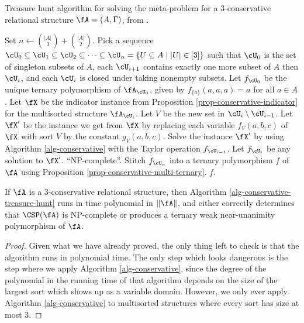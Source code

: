 \begin{algorithm}
\caption{Treasure hunt algorithm for solving the meta-problem for a $3$-conservative relational structure $\fA = (A, \Gamma)$, from \cite{carbonnel-thesis}.}\label{alg-conservative-treasure-hunt}
\begin{algorithmic}[1]
\State Set $n \gets \binom{|A|}{3} + \binom{|A|}{2}$.
\State Pick a sequence $\cU_0 \subseteq \cU_1 \subseteq \cU_2 \subseteq \cdots \subseteq \cU_{n} = \{U \subseteq A \mid |U| \in [3]\}$ such that $\cU_0$ is the set of singleton subsets of $A$, each $\cU_{i+1}$ contains exactly one more subset of $A$ then $\cU_i$, and each $\cU_i$ is closed under taking nonempty subsets.
\State Let $f_{\cU_0}$ be the unique ternary polymorphism of $\fA_{\cU_0}$, given by $f_{\{a\}}(a,a,a) = a$ for all $a \in A$.
\State Let $\fX$ be the indicator instance from Proposition \ref{prop-conservative-indicator} for the multisorted structure $\fA_{\cU_i}$.
\State Let $V$ be the new set in $\cU_i\setminus \cU_{i-1}$.
\State Let $\fX'$ be the instance we get from $\fX$ by replacing each variable $f_V(a,b,c)$ of $\fX$ with sort $V$ by the constant $g_V(a,b,c)$.
\State Solve the instance $\fX'$ by using Algorithm \ref{alg-conservative} with the Taylor operation $f_{\cU_{i-1}}$.%
\State Let $f_{\cU_i}$ be any solution to $\fX'$.
\EndIf
\EndFor
{}
\State \Return ``NP-complete''.
\EndIf
\EndFor
\State Stitch $f_{\cU_n}$ into a ternary polymorphism $f$ of $\fA$ using Proposition \ref{prop-conservative-multi-ternary}.
\State \Return $f$.
\end{algorithmic}
\end{algorithm}

\begin{thm} If $\fA$ is a $3$-conservative relational structure, then Algorithm \ref{alg-conservative-treasure-hunt} runs in time polynomial in $\|\fA\|$, and either correctly determines that $\CSP(\fA)$ is NP-complete or produces a ternary weak near-unanimity polymorphism of $\fA$.
\end{thm}
\begin{proof} Given what we have already proved, the only thing left to check is that the algorithm runs in polynomial time. The only step which looks dangerous is the step where we apply Algorithm \ref{alg-conservative}, since the degree of the polynomial in the running time of that algorithm depends on the size of the largest sort which shows up as a variable domain. However, we only ever apply Algorithm \ref{alg-conservative} to multisorted structures where every sort has size at most $3$.
\end{proof}

